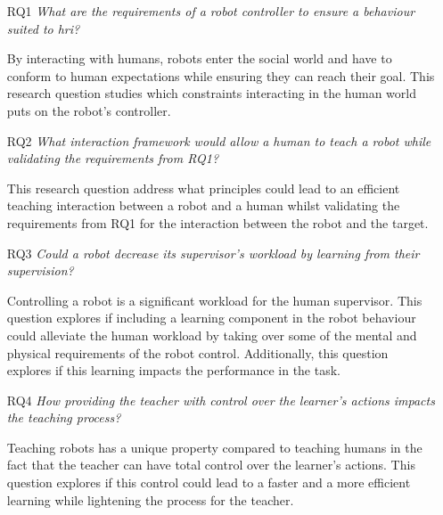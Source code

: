 \begin{itemize}
	\item [RQ1] \emph{What are the requirements of a robot controller to ensure a behaviour suited to \gls{hri}?} 
	
		By interacting with humans, robots enter the social world and have to conform to human expectations while ensuring they can reach their goal. This research question studies which constraints interacting in the human world puts on the robot's controller. 
		
    \item [RQ2] \emph{What interaction framework would allow a human to teach a robot while validating the requirements from RQ1?}
    
    	This research question address what principles could lead to an efficient teaching interaction between a robot and a human whilst validating the requirements from RQ1 for the interaction between the robot and the target. 
    	
    \item [RQ3] \emph{Could a robot decrease its supervisor's workload by learning from their supervision?}
    
        Controlling a robot is a significant workload for the human supervisor. This question explores if including a learning component in the robot behaviour could alleviate the human workload by taking over some of the mental and physical requirements of the robot control. Additionally, this question explores if this learning impacts the performance in the task.
    
    \item [RQ4] \emph{How providing the teacher with control over the learner's actions impacts the teaching process?} 
    
    	Teaching robots has a unique property compared to teaching humans in the fact that the teacher can have total control over the learner's actions. This question explores if this control could lead to a faster and a more efficient learning while lightening the process for the teacher.


\end{itemize}
